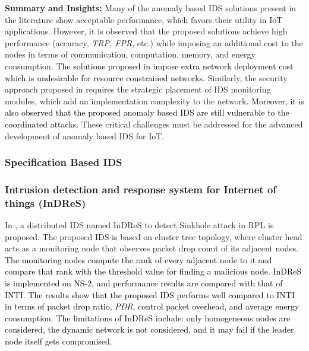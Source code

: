 \documentclass[10pt,journal,sort & compress]{IEEEtran}
\begin{document}
\textbf{Summary and Insights:} Many of the anomaly based IDS solutions present in the literature show acceptable performance, which favors their utility in IoT applications. However, it is observed that the proposed solutions achieve high performance (accuracy, \textit{TRP, FPR}, etc.) while imposing an additional cost to the nodes in terms of communication, computation, memory, and energy consumption. \textcolor{black}{The solutions proposed in \cite{pongle2015real, Cervantes2015, Mayzaud2016, Mayzaud2016Version, chen2016defense, gara2017intrusion ,GaraInderscience} impose extra network deployment cost which is undesirable for resource constrained networks.} Similarly, the security approach proposed in \cite{RAZA20132661} requires the strategic placement of IDS monitoring modules, which add an implementation complexity to the network. \textcolor{black}{Moreover, it is also observed that the proposed anomaly based IDS are still vulnerable to the coordinated attacks.} These critical challenges must be addressed for the advanced development of anomaly based IDS for IoT.      
\subsubsection{Specification Based IDS}

\subsubsection*{Intrusion detection and response system for Internet of things (InDReS)}
In \cite{Surendar2016}, a distributed IDS named InDReS to detect Sinkhole attack in RPL is proposed. The proposed IDS is based on cluster tree topology, where cluster head acts as a monitoring node that observes packet drop count of its adjacent nodes. \textcolor{black}{The monitoring nodes compute the rank of every adjacent node to it and compare that rank with the threshold value for finding a malicious node. InDReS is implemented on NS-$ 2 $, and performance results are compared with that of INTI. The results show that the proposed IDS performs well compared to INTI in terms of packet drop ratio, \textit{PDR}, control packet overhead, and average energy consumption. The limitations of InDReS include: only homogeneous nodes are considered, the dynamic network is not considered, and it may fail if the leader node itself gets compromised.}
\end{document}
